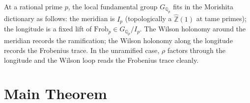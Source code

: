 \begin{remark}
\label{v4-arith:w9-r1:rem:meridian-longitude}
At a rational prime \(p\), the local fundamental group
\(G_{\mathbb Q_{p}}\) fits in the Morishita dictionary as follows:
the meridian is \(I_{p}\) (topologically a \(\widehat{\mathbb Z}(1)\) at
tame primes); the longitude is a fixed lift of
\(\mathrm{Frob}_{p}\in G_{\mathbb Q_{p}}/I_{p}\). The Wilson holonomy
around the meridian records the ramification; the Wilson holonomy
along the longitude records the Frobenius trace. In the unramified
case, \(\rho\) factors through the longitude and the Wilson loop
reads the Frobenius trace cleanly.
\end{remark}

\section{Main Theorem}
\label{v4-arith:w9-r1:sec:main}


